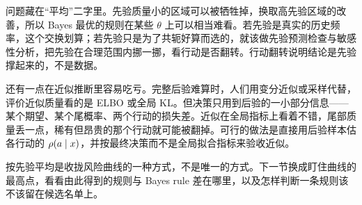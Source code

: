 问题藏在``平均''二字里。先验质量小的区域可以被牺牲掉，换取高先验区域的改善，所以 Bayes 最优的规则在某些 \(\theta\) 上可以相当难看。若先验是真实的历史频率，这个交换划算；若先验只是为了共轭好算而选的，就该做先验预测检查与敏感性分析，把先验在合理范围内挪一挪，看行动是否翻转。行动翻转说明结论是先验撑起来的，不是数据。

还有一点在近似推断里容易吃亏。完整后验难算时，人们用变分近似或采样代替，评价近似质量看的是 ELBO 或全局 KL。但决策只用到后验的一小部分信息——某个期望、某个尾概率、两个行动的损失差。近似在全局指标上看着不错，尾部质量丢一点，稀有但昂贵的那个行动就可能被翻掉。可行的做法是直接用后验样本估各行动的 \(\rho(a\mid x)\)，并按最终决策而不是全局拟合指标来验收近似。

按先验平均是收拢风险曲线的一种方式，不是唯一的方式。下一节换成盯住曲线的最高点，看看由此得到的规则与 Bayes rule 差在哪里，以及怎样判断一条规则该不该留在候选名单上。
